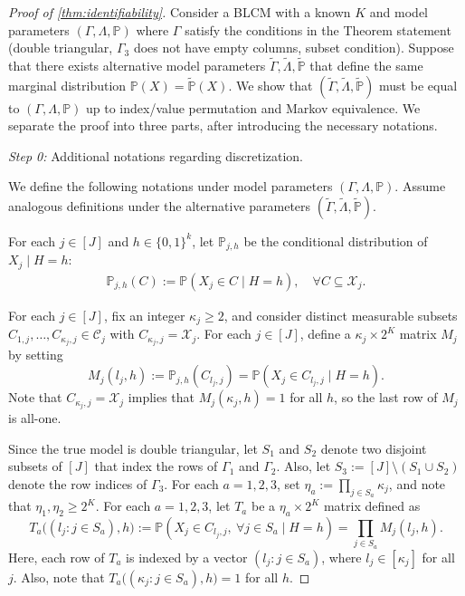\documentclass[10pt]{article} %
\newcommand{\PP}{\mathbb P}
\newcommand{\mcx}{\mathcal X}
\def\tilde{\widetilde}
\begin{document}
\begin{proof}[Proof of \cref{thm:identifiability}]
    Consider a BLCM with a known $K$ and model parameters $(\Gamma, \Lambda,\PP)$ where $\Gamma$ satisfy the conditions in the Theorem statement (double triangular, $\Gamma_3$ does not have empty columns, subset condition).
    Suppose that there exists alternative model parameters $\tilde{\Gamma}, \tilde{\Lambda}, \tilde{\PP}$ that define the same marginal distribution $\PP(X) = \tilde{\PP}(X).$ We show that $(\tilde{\Gamma}, \tilde{\Lambda}, \tilde{\PP})$ must be equal to $(\Gamma, \Lambda,\PP)$ up to index/value permutation and Markov equivalence. 
    We separate the proof into three parts, after introducing the necessary notations.



    \emph{Step 0:} Additional notations regarding discretization.

    We define the following notations under model parameters $(\Gamma, \Lambda,\PP)$. Assume analogous definitions under the alternative parameters $(\tilde{\Gamma}, \tilde{\Lambda}, \tilde{\PP})$.

    
    For each $j \in [J]$ and $h \in \{0,1\}^k$, let $\PP_{j,h}$ be the conditional distribution of $X_j \mid H = h$:
    \begin{align}\label{eq:p_j,aaa def}
        \PP_{j,h}(C) := \PP (X_j \in C \mid H = h), \quad \forall C \subseteq \mathcal{X}_j.
    \end{align}
    
    
    For each $j \in [J]$, fix an integer $\kappa_j \ge 2$, and consider distinct measurable subsets $C_{1,j}, \ldots, C_{\kappa_j, j} \in \mathcal{C}_j$ with $C_{\kappa_j,j} = \mcx_j$.
    For each $j \in [J]$, define a $\kappa_j \times 2^K$ matrix $M_j$ by setting $$M_j(l_j, h) := \PP_{j,h}({C}_{l_j, j}) = \PP(X_j \in {C}_{l_j, j} \mid H = h).$$ 
    Note that $C_{\kappa_j,j} = \mcx_j$ implies that $M_j(\kappa_j, h) = 1$ for all $h$, so the last row of $M_j$ is all-one.

    Since the true model is double triangular, let $S_1$ and $S_2$ denote two disjoint subsets of $[J]$ that index the rows of $\Gamma_1$ and $\Gamma_2$. Also, let $S_3 := [J] \setminus (S_1 \cup S_2)$ denote the row indices of $\Gamma_3$.
    For each $a=1,2,3$, set $\eta_a := \prod_{j \in S_a} \kappa_j$, and note that $\eta_1, \eta_2 \ge 2^K$. 
    For each $a=1,2,3$, let $T_a$ be a $\eta_a \times 2^K$ matrix defined as
    $$T_a\big((l_j: j \in S_a), h\big) := \PP(X_j \in C_{l_j, j}, ~ \forall j \in S_a \mid H = h) = \prod_{j \in S_a} M_j(l_j, h).$$
    Here, each row of $T_a$ is indexed by a vector $(l_j: j \in S_a)$, where $l_j \in [\kappa_j]$ for all $j$. Also, note that $T_a\big((\kappa_j: j \in S_a), h\big) = 1$ for all $h$.
    

\end{proof}
\end{document}
